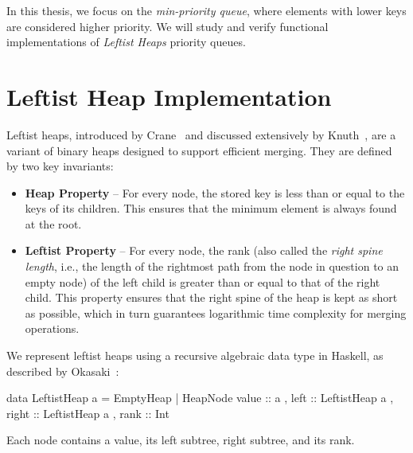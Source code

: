 In this thesis, we focus on the \emph{min-priority queue}, where elements with lower keys are considered higher priority.
We will study and verify functional implementations of \emph{Leftist Heaps} priority queues.


\section{Leftist Heap Implementation}

Leftist heaps, introduced by Crane~\cite{crane1972} and discussed extensively by
Knuth~\cite{knuth1973taocp3}, are a variant of binary heaps designed to support
efficient merging. They are defined by two key invariants:

\begin{itemize}
	\item \textbf{Heap Property} – For every node, the stored key is less than or equal
	      to the keys of its children. This ensures that the minimum element is always
	      found at the root.

	\item \textbf{Leftist Property} – For every node, the rank (also called the
	      \emph{right spine length}, i.e., the length of the rightmost path from the node in question to an empty node)
	      of the left child is greater than or equal to that of the right child.
	      This property ensures that the right spine of the heap is kept as short as
	      possible, which in turn guarantees logarithmic time complexity for merging
	      operations.
\end{itemize}

We represent leftist heaps using a recursive algebraic data type in Haskell, as described by Okasaki~\cite{okasaki}:
\begin{code}[caption={Leftist Heap data type}, label={lst:leftist}]
	data LeftistHeap a
	= EmptyHeap
	| HeapNode
		{ value :: a
			, left  :: LeftistHeap a
			, right :: LeftistHeap a
			, rank  :: Int
		}
\end{code}

Each node contains a value, its left subtree, right subtree, and its rank.

